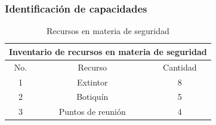     
    \subsubsection{Identificación de capacidades}
    
    \begin{table}[H]
        \centering
        \caption{Recursos en materia de seguridad}
        \begin{tabular}{c c c}
        \hline
        \multicolumn{3}{c}{Inventario de recursos en materia de seguridad}\\
        \hline
             No.& Recurso & Cantidad  \\
        \hline
             1& Extintor & 8  \\
        \hline
             2& Botiquín & 5 \\
        \hline
             3& Puntos de reunión & 4 \\
        \hline     
        \end{tabular}
        \label{tab:inventario}
    \end{table}
